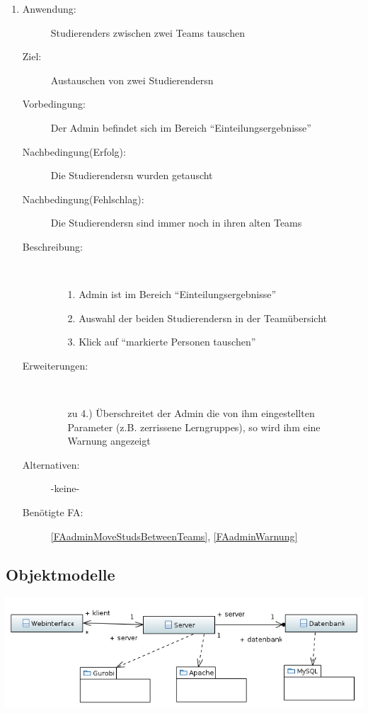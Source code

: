 \documentclass[parskip=full]{scrartcl}
\newcommand{\swtLabel}[1]{\textbf{/#1\arabic*0/}}
\begin{document}
\begin{enumerate} [label=\swtLabel{A}]
  \item \label{UCadminSwapStudsBetweenTeams}
    \begin{description}
  	\item[Anwendung:] \glspl{Studierender} zwischen zwei \glspl{Team} tauschen
  	\item[Ziel:] Austauschen von zwei \glspl{Studierender}n
  	\item[Vorbedingung:] Der \gls{Admin} befindet sich im Bereich
  	\enquote{\gls{Einteilung}sergebnisse}
  	\item[Nachbedingung(Erfolg):] Die \glspl{Studierender}n wurden getauscht
  	\item[Nachbedingung(Fehlschlag):] Die \glspl{Studierender}n sind immer noch in ihren
  	alten \glspl{Team}
  	\item[Beschreibung:]~
  	\begin{enumerate}
  	  \item[1.] \gls{Admin} ist im Bereich \enquote{\gls{Einteilung}sergebnisse}
      \item[2.] Auswahl der beiden \glspl{Studierender}n in der \gls{Team}übersicht
      \item[3.] Klick auf \enquote{markierte Personen tauschen}
  	\end{enumerate}
  	\item[Erweiterungen:]~
  	\begin{enumerate}
  	  \item [zu 4.)] Überschreitet der \gls{Admin} die von ihm eingestellten
  	  Parameter (z.B. zerrissene \glspl{Lerngruppe}), so wird ihm eine Warnung angezeigt
  	\end{enumerate}  
  	\item[Alternativen:] -keine-
  	\item[Benötigte FA:] \ref{FAadminMoveStudsBetweenTeams}, \ref{FAadminWarnung}
  \end{description}
  
\end{enumerate}  
\subsection{Objektmodelle}

\includegraphics[width=\linewidth]{diagramme_pflichtenheft/ClassDiagram.PNG}
\end{document}
